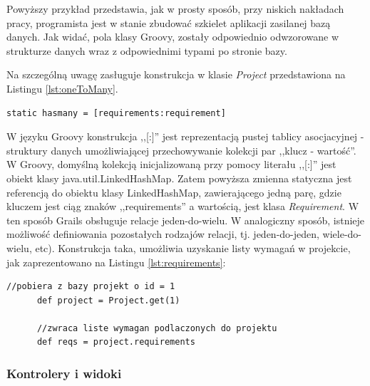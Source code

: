     Powyższy przykład przedstawia, jak w prosty sposób, przy niskich nakładach pracy, programista jest w stanie zbudować szkielet aplikacji zasilanej bazą danych. Jak widać, pola klasy Groovy, zostały odpowiednio odwzorowane w strukturze danych wraz z odpowiednimi typami po stronie bazy.

    Na szczególną uwagę zasługuje konstrukcja w klasie \emph{Project} przedstawiona na Listingu \ref{lst:oneToMany}.

    \begin{lstlisting}[caption={relacja jeden-do-wielu}, label={lst:oneToMany}]
      static hasmany = [requirements:requirement]
    \end{lstlisting}

    W języku Groovy konstrukcja ,,[:]'' jest reprezentacją pustej tablicy asocjacyjnej - struktury danych umożliwiającej przechowywanie kolekcji par ,,klucz - wartość''. W Groovy, domyślną kolekcją inicjalizowaną przy pomocy literału ,,[:]'' jest obiekt klasy java.util.LinkedHashMap. Zatem powyższa zmienna statyczna jest referencją do obiektu klasy LinkedHashMap, zawierającego jedną parę, gdzie kluczem jest ciąg znaków ,,requirements'' a wartością, jest klasa \emph{Requirement}. W ten sposób Grails obsługuje relacje jeden-do-wielu. W analogiczny sposób, istnieje możliwość definiowania pozostałych rodzajów relacji, tj. jeden-do-jeden, wiele-do-wielu, etc). Konstrukcja taka, umożliwia uzyskanie listy wymagań w projekcie, jak zaprezentowano na Listingu \ref{lst:requirements}: 

    \begin{lstlisting}[caption={wymagania przypisane do projektu}, label={lst:requirements}]
      //pobiera z bazy projekt o id = 1
      def project = Project.get(1)

      //zwraca liste wymagan podlaczonych do projektu
      def reqs = project.requirements 
    \end{lstlisting}
    
      
    \subsubsection{Kontrolery i widoki}


